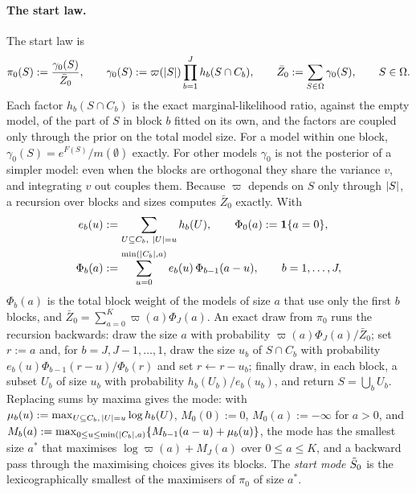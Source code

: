 \paragraph{The start law.} The start law is
\begin{equation}\label{eq:startlaw}
  \pi_0(S):=\frac{\gamma_0(S)}{\bar Z_0},\qquad \gamma_0(S):=\varpi(\lvert S\rvert)\prod_{b=1}^{J}h_b(S\cap C_b),\qquad
  \bar Z_0:=\sum_{S\in\Omega}\gamma_0(S),\qquad S\in\Omega .
\end{equation}
Each factor $h_b(S\cap C_b)$ is the exact marginal-likelihood ratio, against the empty model, of the part of $S$ in
block $b$ fitted on its own, and the factors are coupled only through the prior on the total model size. For a model
within one block, $\gamma_0(S)=e^{F(S)}/m(\emptyset)$ exactly. For other models $\gamma_0$ is not the posterior of a
simpler model: even when the blocks are orthogonal they share the variance $v$, and integrating $v$ out couples
them. Because $\varpi$ depends on $S$ only through
$\lvert S\rvert$, a recursion over blocks and sizes computes $\bar Z_0$ exactly. With
\begin{equation}\label{eq:recursion}
  \begin{aligned}
    e_b(u)&:=\sum_{U\subseteq C_b,\ \lvert U\rvert=u}h_b(U),\qquad \Phi_0(a):=\mathbf{1}\{a=0\},\\
    \Phi_b(a)&:=\sum_{u=0}^{\min(\lvert C_b\rvert,a)}e_b(u)\,\Phi_{b-1}(a-u),\qquad b=1,\dots,J,
  \end{aligned}
\end{equation}
$\Phi_b(a)$ is the total block weight of the models of size $a$ that use only the first $b$ blocks, and
$\bar Z_0=\sum_{a=0}^{K}\varpi(a)\Phi_J(a)$. An exact draw from $\pi_0$ runs the recursion backwards: draw the size
$a$ with probability $\varpi(a)\Phi_J(a)/\bar Z_0$; set $r:=a$ and, for $b=J,J-1,\dots,1$, draw the size $u_b$ of
$S\cap C_b$ with probability $e_b(u)\Phi_{b-1}(r-u)/\Phi_b(r)$ and set $r\gets r-u_b$; finally draw, in each block,
a subset $U_b$ of size $u_b$ with probability $h_b(U_b)/e_b(u_b)$, and return $S=\bigcup_bU_b$. Replacing sums by
maxima gives the mode: with $\mu_b(u):=\max_{U\subseteq C_b,\,\lvert U\rvert=u}\log h_b(U)$, $M_0(0):=0$, $M_0(a):=-\infty$ for
$a>0$, and $M_b(a):=\max_{0\le u\le\min(\lvert C_b\rvert,a)}\{M_{b-1}(a-u)+\mu_b(u)\}$, the mode has the smallest size $a^*$
that maximises $\log\varpi(a)+M_J(a)$ over $0\le a\le K$, and a backward pass through the maximising choices gives its blocks. The \emph{start mode}
$\tilde S_0$ is the lexicographically smallest of the maximisers of $\pi_0$ of size $a^*$.

